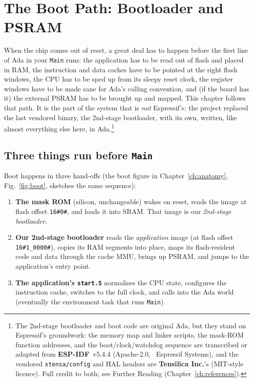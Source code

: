 \chapter{The Boot Path: Bootloader and PSRAM}
\label{ch:bootloader}

When the chip comes out of reset, a great deal has to happen before the first
line of Ada in your \texttt{Main} runs: the application has to be read out of
flash and placed in RAM, the instruction and data caches have to be pointed at
the right flash windows, the CPU has to be sped up from its sleepy reset clock,
the register windows have to be made sane for Ada's calling convention, and
(if the board has it) the external PSRAM has to be brought up and mapped. This
chapter follows that path. It is the part of the system that is \emph{not}
Espressif's: the project replaced the last vendored binary, the 2nd-stage
bootloader, with its own, written, like almost everything else here, in
Ada.\footnote{The 2nd-stage bootloader and boot code are original Ada, but they
stand on Espressif's groundwork: the memory map and linker scripts, the mask-ROM
function addresses, and the boot/clock/watchdog sequence are transcribed or adapted
from \textbf{ESP-IDF}~v5.4.4 (Apache-2.0, \textcopyright~Espressif Systems), and the
vendored \texttt{xtensa/config} and HAL headers are \textbf{Tensilica Inc.}'s
(MIT-style licence). Full credit to both; see Further Reading
(Chapter~\ref{ch:references}).}

\section{Three things run before \texttt{Main}}

Boot happens in three hand-offs (the boot figure in
Chapter~\ref{ch:anatomy}, Fig.~\ref{fig:boot}, sketches the same sequence):

\begin{enumerate}
\item \textbf{The mask ROM} (silicon, unchangeable) wakes on reset, reads the
  image at flash offset \texttt{16\#0\#}, and loads it into SRAM. That image is our
  \emph{2nd-stage bootloader}.
\item \textbf{Our 2nd-stage bootloader} reads the \emph{application} image (at
  flash offset \texttt{16\#1\_0000\#}), copies its RAM segments into place, maps its
  flash-resident code and data through the cache MMU, brings up PSRAM, and jumps
  to the application's entry point.
\item \textbf{The application's \texttt{start.S}} normalises the CPU state,
  configures the instruction cache, switches to the full clock, and calls into
  the Ada world (eventually the environment task that runs \texttt{Main}).
\end{enumerate}

